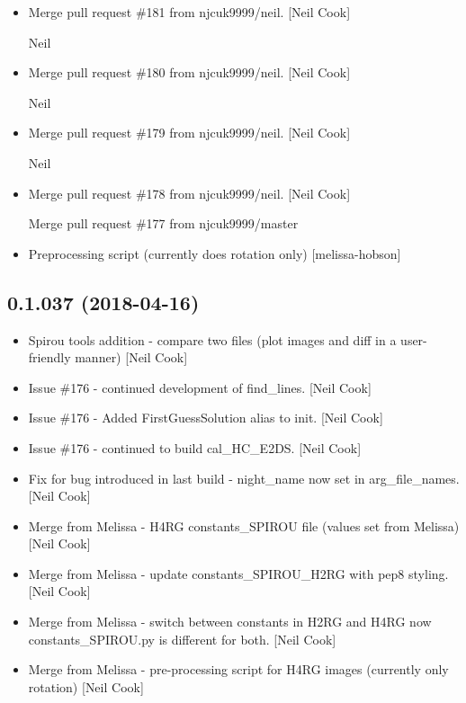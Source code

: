 \documentclass[a4paper,10pt,english]{report}
\begin{document}
\begin{itemize}
\item {} 
Merge pull request \#181 from njcuk9999/neil. {[}Neil Cook{]}

Neil

\item {} 
Merge pull request \#180 from njcuk9999/neil. {[}Neil Cook{]}

Neil

\item {} 
Merge pull request \#179 from njcuk9999/neil. {[}Neil Cook{]}

Neil

\item {} 
Merge pull request \#178 from njcuk9999/neil. {[}Neil Cook{]}

Merge pull request \#177 from njcuk9999/master

\item {} 
Preprocessing script (currently does rotation only) {[}melissa-hobson{]}

\end{itemize}


\subsection{0.1.037 (2018-04-16)}
\label{\detokenize{misc/changelog:id460}}\begin{itemize}
\item {} 
Spirou tools addition - compare two files (plot images and diff in a
user-friendly manner) {[}Neil Cook{]}

\item {} 
Issue \#176 - continued development of find\_lines. {[}Neil Cook{]}

\item {} 
Issue \#176 - Added FirstGuessSolution alias to init. {[}Neil Cook{]}

\item {} 
Issue \#176 - continued to build cal\_HC\_E2DS. {[}Neil Cook{]}

\item {} 
Fix for bug introduced in last build - night\_name now set in
arg\_file\_names. {[}Neil Cook{]}

\item {} 
Merge from Melissa - H4RG constants\_SPIROU file (values set from
Melissa) {[}Neil Cook{]}

\item {} 
Merge from Melissa - update constants\_SPIROU\_H2RG with pep8 styling.
{[}Neil Cook{]}

\item {} 
Merge from Melissa - switch between constants in H2RG and H4RG now
constants\_SPIROU.py is different for both. {[}Neil Cook{]}

\item {} 
Merge from Melissa - pre-processing script for H4RG images (currently
only rotation) {[}Neil Cook{]}

\end{itemize}
\end{document}
